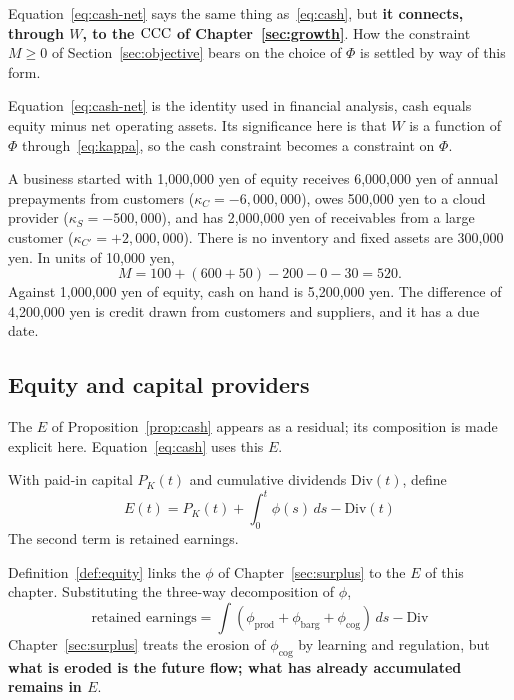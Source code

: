 Equation~\eqref{eq:cash-net} says the same thing as~\eqref{eq:cash}, but
\textbf{it connects, through $W$, to the $\mathrm{CCC}$ of Chapter~\ref{sec:growth}}.
How the constraint $M\geq 0$ of Section~\ref{sec:objective} bears on the choice of $\Phi$
is settled by way of this form.

\begin{remark}
Equation~\eqref{eq:cash-net} is the identity used in financial analysis, cash equals equity
minus net operating assets. Its significance here is that $W$ is a function of $\Phi$
through~\eqref{eq:kappa}, so the cash constraint becomes a constraint on $\Phi$.
\end{remark}

\begin{example}
\label{ex:three-sources}
A business started with 1{,}000{,}000 yen of equity receives 6{,}000{,}000 yen of annual
prepayments from customers ($\kappa_C=-6{,}000{,}000$), owes 500{,}000 yen to a cloud
provider ($\kappa_S=-500{,}000$), and has 2{,}000{,}000 yen of receivables from a large
customer ($\kappa_{C'}=+2{,}000{,}000$). There is no inventory and fixed assets are
300{,}000 yen. In units of 10{,}000 yen,
\[
M = 100 + (600+50) - 200 - 0 - 30 = 520 .
\]
Against 1{,}000{,}000 yen of equity, cash on hand is 5{,}200{,}000 yen. The difference of
4{,}200{,}000 yen is credit drawn from customers and suppliers, and it has a due date.
\end{example}

\subsection{Equity and capital providers}
\label{sec:equity}

The $E$ of Proposition~\ref{prop:cash} appears as a residual; its composition is made
explicit here. Equation~\eqref{eq:cash} uses this $E$.

\begin{definition}[Equity]
\label{def:equity}
With paid-in capital $P_K(t)$ and cumulative dividends $\mathrm{Div}(t)$, define
\begin{equation}
E(t) = P_K(t) + \int_0^t \phi(s)\,ds - \mathrm{Div}(t)
\label{eq:equity}
\end{equation}
The second term is retained earnings.
\end{definition}

Definition~\ref{def:equity} links the $\phi$ of Chapter~\ref{sec:surplus} to the $E$ of this
chapter. Substituting the three-way decomposition of $\phi$,
\[
\text{retained earnings} = \int (\phi_{\mathrm{prod}} + \phi_{\mathrm{barg}} + \phi_{\mathrm{cog}})\,ds - \mathrm{Div}
\]
Chapter~\ref{sec:surplus} treats the erosion of $\phi_{\mathrm{cog}}$ by learning and
regulation, but
\textbf{what is eroded is the future flow; what has already accumulated remains in $E$}.

